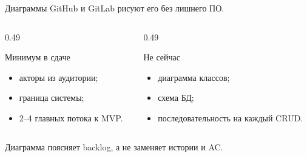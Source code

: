 \begin{frame}{Диаграммы}
   GitHub и GitLab рисуют его без лишнего ПО.

  \medskip
  \begin{columns}[T]
    \begin{column}{0.49\textwidth}
      \begin{block}{Минимум в сдаче}
        \begin{itemize}
          \item акторы из аудитории;
          \item граница системы;
          \item 2--4 главных потока к MVP.
        \end{itemize}
      \end{block}
    \end{column}
    \begin{column}{0.49\textwidth}
      \begin{block}{Не сейчас}
        \begin{itemize}
          \item диаграмма классов;
          \item схема БД;
          \item последовательность на каждый CRUD.
        \end{itemize}
      \end{block}
    \end{column}
  \end{columns}

  \vspace{0.45em}
  {\small\color{acGray}
  Диаграмма поясняет backlog, а не заменяет истории и AC.}
\end{frame}
